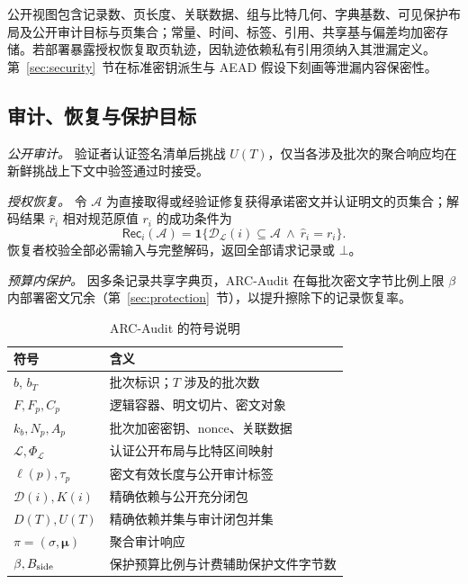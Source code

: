 \documentclass[10pt,journal]{IEEEtran}
\begin{document}
公开视图包含记录数、页长度、关联数据、组与比特几何、字典基数、可见保护布局及公开审计目标与页集合；常量、时间、标签、引用、共享基与偏差均加密存储。若部署暴露授权恢复取页轨迹，因轨迹依赖私有引用须纳入其泄漏定义。第~\ref{sec:security}~节在标准密钥派生与 AEAD 假设下刻画等泄漏内容保密性。

\subsection{审计、恢复与保护目标}
\emph{公开审计。} 验证者认证签名清单后挑战 $U(T)$，仅当各涉及批次的聚合响应均在新鲜挑战上下文中验签通过时接受。

\emph{授权恢复。} 令 $\mathcal A$ 为直接取得或经验证修复获得承诺密文并认证明文的页集合；解码结果 $\widehat r_i$ 相对规范原值 $r_i$ 的成功条件为
\begin{equation}\label{eq:record-recovery}
\mathsf{Rec}_i(\mathcal A)=
\mathbf1\{\mathcal D_{\mathcal L}(i)\subseteq\mathcal A
\ \land\ \widehat r_i=r_i\}.
\end{equation}
恢复者校验全部必需输入与完整解码，返回全部请求记录或 $\bot$。

\emph{预算内保护。} 因多条记录共享字典页，ARC-Audit 在每批次密文字节比例上限 $\beta$ 内部署密文冗余（第~\ref{sec:protection}~节），以提升擦除下的记录恢复率。

\begin{table}[t]\centering\small
\caption{ARC-Audit 的符号说明}\label{tab:notation}
\begin{tabular}{@{}l>{\raggedright\arraybackslash}p{}@{}}\toprule
符号 & 含义\\\midrule
$b$, $b_T$ & 批次标识；$T$ 涉及的批次数\\
$F,F_p,C_p$ & 逻辑容器、明文切片、密文对象\\
$k_b,N_p,A_p$ & 批次加密密钥、nonce、关联数据\\
$\mathcal L,\Phi_{\mathcal L}$ & 认证公开布局与比特区间映射\\
$\ell(p),\tau_p$ & 密文有效长度与公开审计标签\\
$\mathcal D(i),K(i)$ & 精确依赖与公开充分闭包\\
$D(T),U(T)$ & 精确依赖并集与审计闭包并集\\
$\pi=(\sigma,\boldsymbol\mu)$ & 聚合审计响应\\
$\beta,B_{\rm side}$ & 保护预算比例与计费辅助保护文件字节数\\\bottomrule
\end{tabular}\end{table}
\end{document}
